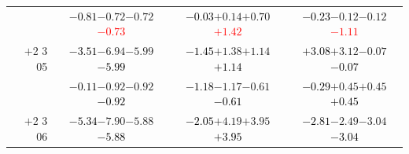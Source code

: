 \documentclass[compress]{beamer}
\begin{document}
\begin{frame}
\begin{tabular}{r | c | c | c}
          & \textcolor{black}{$-0.81$}\hspace{0.1 cm}$-0.72$\hspace{0.1 cm}$-0.72$\hspace{0.1 cm}\textcolor{red}{$-0.73$} & \textcolor{black}{$-0.03$}\hspace{0.1 cm}$+0.14$\hspace{0.1 cm}$+0.70$\hspace{0.1 cm}\textcolor{red}{$+1.42$} & \textcolor{black}{$-0.23$}\hspace{0.1 cm}$-0.12$\hspace{0.1 cm}$-0.12$\hspace{0.1 cm}\textcolor{red}{$-1.11$} \\
$+$2 3 05 & \textcolor{black}{$-3.51$}\hspace{0.1 cm}$-6.94$\hspace{0.1 cm}$-5.99$\hspace{0.1 cm}\textcolor{black}{$-5.99$} & \textcolor{black}{$-1.45$}\hspace{0.1 cm}$+1.38$\hspace{0.1 cm}$+1.14$\hspace{0.1 cm}\textcolor{black}{$+1.14$} & \textcolor{black}{$+3.08$}\hspace{0.1 cm}$+3.12$\hspace{0.1 cm}$-0.07$\hspace{0.1 cm}\textcolor{black}{$-0.07$} \\
          & \textcolor{black}{$-0.11$}\hspace{0.1 cm}$-0.92$\hspace{0.1 cm}$-0.92$\hspace{0.1 cm}\textcolor{black}{$-0.92$} & \textcolor{black}{$-1.18$}\hspace{0.1 cm}$-1.17$\hspace{0.1 cm}$-0.61$\hspace{0.1 cm}\textcolor{black}{$-0.61$} & \textcolor{black}{$-0.29$}\hspace{0.1 cm}$+0.45$\hspace{0.1 cm}$+0.45$\hspace{0.1 cm}\textcolor{black}{$+0.45$} \\
$+$2 3 06 & \textcolor{black}{$-5.34$}\hspace{0.1 cm}$-7.90$\hspace{0.1 cm}$-5.88$\hspace{0.1 cm}\textcolor{black}{$-5.88$} & \textcolor{black}{$-2.05$}\hspace{0.1 cm}$+4.19$\hspace{0.1 cm}$+3.95$\hspace{0.1 cm}\textcolor{black}{$+3.95$} & \textcolor{black}{$-2.81$}\hspace{0.1 cm}$-2.49$\hspace{0.1 cm}$-3.04$\hspace{0.1 cm}\textcolor{black}{$-3.04$} \\

\end{tabular}
\end{frame}
\end{document}
